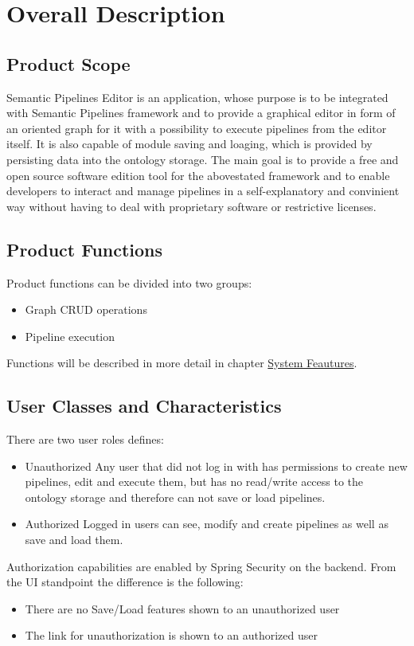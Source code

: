 \documentclass{article}
\begin{document}
\section{Overall Description}
\subsection{Product Scope}
Semantic Pipelines Editor is an application, whose purpose is to be integrated with Semantic Pipelines framework and to provide a graphical editor in form of an oriented graph for it with a possibility to execute pipelines from the editor itself. It is also capable of module saving and loaging, which is provided by persisting data into the ontology storage. The main goal is to provide a free and open source software edition tool for the abovestated framework and to enable developers to interact and manage pipelines in a self-explanatory and convinient way without having to deal with proprietary software or restrictive licenses.
\subsection{Product Functions}
Product functions can be divided into two groups:
\begin{itemize}
    \item Graph CRUD operations
    \item Pipeline execution
\end{itemize}
Functions will be described in more detail in chapter \hyperref[sec:features]{System Feautures}.
\subsection{User Classes and Characteristics}
There are two user roles defines:
\begin{itemize}
    \item Unauthorized
	Any user that did not log in with has permissions to create new pipelines, edit and execute them, but has no read/write access to the ontology storage and therefore can not save or load pipelines.
    \item Authorized 
	Logged in users can see, modify and create pipelines as well as save and load them.
\end{itemize}
Authorization capabilities are enabled by Spring Security on the backend. From the UI standpoint the difference is the following:
\begin{itemize}
    \item There are no Save/Load features shown to an unauthorized user
    \item The link for unauthorization is shown to an authorized user
\end{itemize}
\end{document}
